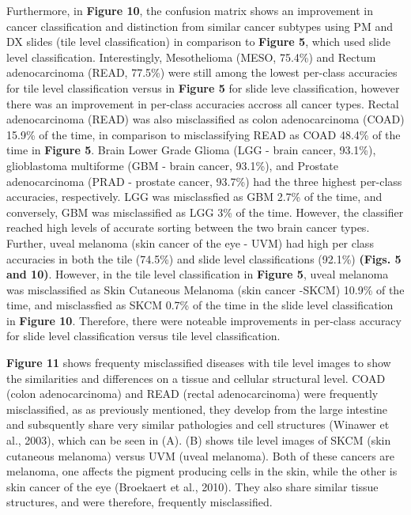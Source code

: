 \documentclass[12pt,]{article}
\begin{document}
Furthermore, in \textbf{Figure 10}, the confusion matrix shows an
improvement in cancer classification and distinction from similar cancer
subtypes using PM and DX slides (tile level classification) in
comparison to \textbf{Figure 5}, which used slide level classification.
Interestingly, Mesothelioma (MESO, 75.4\%) and Rectum adenocarcinoma
(READ, 77.5\%) were still among the lowest per-class accuracies for tile
level classification versus in \textbf{Figure 5} for slide leve
classification, however there was an improvement in per-class accuracies
accross all cancer types. Rectal adenocarcinoma (READ) was also
misclassified as colon adenocarcinoma (COAD) 15.9\% of the time, in
comparison to misclassifying READ as COAD 48.4\% of the time in
\textbf{Figure 5}. Brain Lower Grade Glioma (LGG - brain cancer,
93.1\%), glioblastoma multiforme (GBM - brain cancer, 93.1\%), and
Prostate adenocarcinoma (PRAD - prostate cancer, 93.7\%) had the three
highest per-class accuracies, respectively. LGG was misclassfied as GBM
2.7\% of the time, and conversely, GBM was misclassified as LGG 3\% of
the time. However, the classifier reached high levels of accurate
sorting between the two brain cancer types. Further, uveal melanoma
(skin cancer of the eye - UVM) had high per class accuracies in both the
tile (74.5\%) and slide level classifications (92.1\%) \textbf{(Figs. 5
and 10)}. However, in the tile level classification in \textbf{Figure
5}, uveal melanoma was misclassified as Skin Cutaneous Melanoma (skin
cancer -SKCM) 10.9\% of the time, and misclassfied as SKCM 0.7\% of the
time in the slide level classification in \textbf{Figure 10}. Therefore,
there were noteable improvements in per-class accuracy for slide level
classification versus tile level classification.

\textbf{Figure 11} shows frequenty misclassified diseases with tile
level images to show the similarities and differences on a tissue and
cellular structural level. COAD (colon adenocarcinoma) and READ (rectal
adenocarcinoma) were frequently misclassified, as as previously
mentioned, they develop from the large intestine and subsquently share
very similar pathologies and cell structures (Winawer et al., 2003),
which can be seen in (A). (B) shows tile level images of SKCM (skin
cutaneous melanoma) versus UVM (uveal melanoma). Both of these cancers
are melanoma, one affects the pigment producing cells in the skin, while
the other is skin cancer of the eye (Broekaert et al., 2010). They also
share similar tissue structures, and were therefore, frequently
misclassified.
\end{document}
